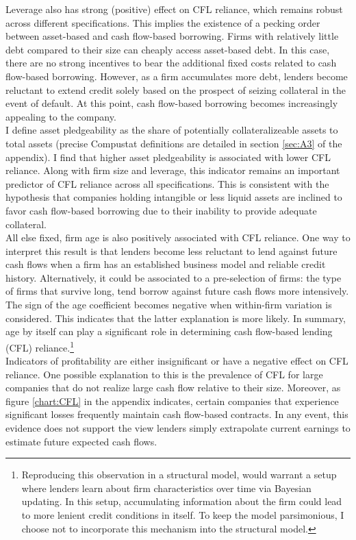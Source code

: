 \documentclass[12pt]{article}
\begin{document}
Leverage also has strong (positive) effect on CFL reliance, which remains robust across different specifications. This implies the existence of a pecking order between asset-based and cash flow-based borrowing. Firms with relatively little debt compared to their size can cheaply access asset-based debt. In this case, there are no strong incentives to bear the additional fixed costs related to cash flow-based borrowing. However, as a firm accumulates more debt, lenders become reluctant to extend credit solely based on the prospect of seizing collateral in the event of default. At this point, cash flow-based borrowing becomes increasingly appealing to the company. \vspace{3mm} \\
I define asset pledgeability as the share of potentially collateralizeable assets to total assets (precise Compustat definitions are detailed in section \ref{sec:A3} of the appendix). I find that higher asset pledgeability is associated with lower CFL reliance. Along with firm size and leverage, this indicator remains an important predictor of CFL reliance across all specifications. This is consistent with the hypothesis that companies holding intangible or less liquid assets are inclined to favor cash flow-based borrowing due to their inability to provide adequate collateral.  \vspace{3mm} \\
All else fixed, firm age is also positively associated with CFL reliance. One way to interpret this result is that lenders become less reluctant to lend against future cash flows when a firm has an established business model and reliable credit history. Alternatively, it could be associated to a pre-selection of firms: the type of firms that survive long, tend borrow against future cash flows more intensively. The sign of the age coefficient becomes negative when within-firm variation is considered. This indicates that the latter explanation is more likely. In summary, age by itself can play a significant role in determining cash flow-based lending (CFL) reliance.\footnote{Reproducing this observation in a structural model, would warrant a setup where lenders learn about firm characteristics over time via Bayesian updating. In this setup, accumulating information about the firm could lead to more lenient credit conditions in itself. To keep the model parsimonious, I choose not to incorporate this mechanism into the structural model.}
\vspace{3mm} \\
Indicators of profitability are either insignificant or have a negative effect on CFL reliance.  One possible explanation to this is the prevalence of CFL for large companies that do not realize large cash flow relative to their size. Moreover, as figure \ref{chart:CFL} in the appendix indicates, certain companies that experience significant losses frequently maintain cash flow-based contracts. In any event, this evidence does not support the view lenders simply extrapolate current earnings to estimate future expected cash flows. \vspace{3mm} \\
\end{document}
